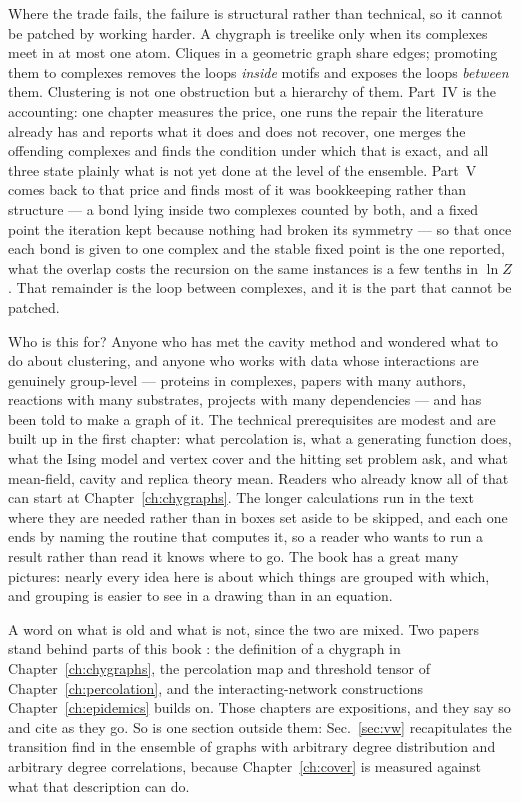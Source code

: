 Where the trade fails, the failure is structural rather than technical, so it
cannot be patched by working harder. A
chygraph is treelike only when its complexes meet in at most one atom. Cliques
in a geometric graph share edges; promoting them to complexes removes the loops
\emph{inside} motifs and exposes the loops \emph{between} them. Clustering is not one obstruction
but a hierarchy of them. Part~IV is the accounting: one chapter measures the
price, one runs the repair the literature already has and reports what it does
and does not recover, one merges the offending complexes and finds the condition
under which that is exact, and all three state plainly what is not yet done at
the level of the ensemble. Part~V comes back to that price and finds most of
it was bookkeeping rather than structure --- a bond lying inside two complexes
counted by both, and a fixed point the iteration kept because nothing had
broken its symmetry --- so that once each bond is given to one complex and
the stable fixed point is the one reported, what the overlap costs the
recursion on the same instances is a few tenths in $\ln Z$. That remainder is
the loop between complexes, and it is the part that cannot be patched.

Who is this for? Anyone who has met the cavity method and wondered what to do
about clustering, and anyone who works with data whose interactions are
genuinely group-level --- proteins in complexes, papers with many authors,
reactions with many substrates, projects with many dependencies --- and has been
told to make a graph of it. The technical prerequisites are modest and are built
up in the first chapter: what percolation is, what a generating function does,
what the Ising model and vertex cover and the hitting set problem ask, and what
mean-field, cavity and replica theory mean. Readers who already know all of that
can start at Chapter~\ref{ch:chygraphs}. The longer calculations run in the text
where they are needed rather than in boxes set aside to be skipped, and each one
ends by naming the routine that computes it, so a reader who wants to run a
result rather than read it knows where to go. The book has a great many
pictures: nearly every idea here is about which things are grouped with which,
and grouping is easier to see in a drawing than in an equation.

A word on what is old and what is not, since the two are mixed.
Two papers stand behind parts of this book \citep{vazquez2023pre,vazquez2024comnet}:
the definition of a chygraph in Chapter~\ref{ch:chygraphs}, the percolation map
and threshold tensor of Chapter~\ref{ch:percolation}, and the interacting-network
constructions Chapter~\ref{ch:epidemics} builds on. Those chapters are expositions,
and they say so and cite as they go. So is one section outside them:
Sec.~\ref{sec:vw} recapitulates the transition \citet{vazquez2003vw} find in
the ensemble of graphs with arbitrary degree distribution and arbitrary degree
correlations, because Chapter~\ref{ch:cover} is measured against what that
description can do.

